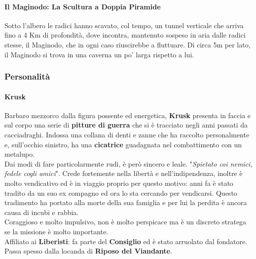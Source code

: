 \documentclass[10pt,twoside,onecolumn,openany]{book}
\begin{document}
\paragraph{Il Maginodo: La Scultura a Doppia Piramide}
Sotto l'albero le radici hanno scavato, col tempo, un tunnel verticale che arriva fino a 4 Km di profondità, dove incontra, mantenuto sospeso in aria dalle radici stesse, il Maginodo, che in ogni caso riuscirebbe a fluttuare. Di circa 5m per lato, il Maginodo si trova in una caverna un po' larga rispetto a lui.\\
\subsubsection{Personalità}
\paragraph{Krusk}
Barbaro mezzorco dalla figura possente ed energetica, \textbf{Krusk} presenta in faccia e sul corpo una serie di \textbf{pitture di guerra} che si è tracciato negli anni passati da cacciadraghi. Indossa una collana di denti e zanne che ha raccolto personalmente e, sull'occhio sinistro, ha una \textbf{cicatrice} guadagnata nel combattimento con un metalupo.\\
Dai modi di fare particolarmente rudi, è però sincero e leale. "\textit{Spietato coi nemici, fedele cogli amici}". Crede fortemente nella libertà e nell'indipendenza, inoltre è molto vendicativo ed è in viaggio proprio per questo motivo: anni fa è stato tradito da un suo ex compagno ed ora lo sta cercando per vendicarsi. Questo tradimento ha portato alla morte della sua famiglia e per lui la perdita è ancora causa di incubi e rabbia.\\
Coraggioso e molto impulsivo, non è molto perspicace ma è un discreto stratega se la missione è molto importante.\\
Affiliato ai \textbf{Liberisti}: fa parte del \textbf{Consiglio} ed è stato arruolato dal fondatore. Passa spesso dalla locanda di \textbf{Riposo del Viandante}.
\newpage
\end{document}
